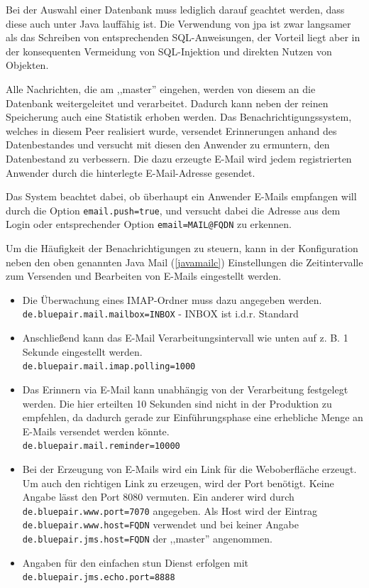 \documentclass[oneside, ngerman, toc=bibliography,bibliography=totoc,listof=entryprefix, open=right,numbers=noenddot,fontsize=12pt]{scrbook}
\begin{document}
Bei der Auswahl einer Datenbank muss lediglich darauf geachtet werden, dass diese auch unter Java lauffähig ist. 
Die Verwendung von \acrshort{jpa} ist zwar langsamer als das Schreiben von entsprechenden SQL-Anweisungen, der Vorteil liegt aber in der konsequenten Vermeidung von SQL-Injektion und direkten Nutzen von Objekten.


Alle Nachrichten, die am ,,master'' eingehen, werden von diesem an die Datenbank weitergeleitet und verarbeitet. Dadurch kann neben der reinen Speicherung auch eine Statistik erhoben werden. Das Benachrichtigungssystem, welches in diesem Peer realisiert wurde, versendet Erinnerungen anhand des Datenbestandes und versucht mit diesen den Anwender zu ermuntern, den Datenbestand zu verbessern.
Die dazu erzeugte E-Mail wird jedem registrierten Anwender durch die hinterlegte E-Mail-Adresse gesendet.

Das System beachtet dabei, ob überhaupt ein Anwender E-Mails empfangen will durch die Option \verb|email.push=true|, und versucht dabei die Adresse aus dem Login oder entsprechender Option \verb|email=MAIL@FQDN| zu erkennen.

Um die Häufigkeit der Benachrichtigungen zu steuern, kann in der Konfiguration neben den oben genannten Java Mail (\ref{javamailc}) Einstellungen die Zeitintervalle zum Versenden und Bearbeiten von E-Mails eingestellt werden.

\begin{itemize}
    \item Die Überwachung eines IMAP-Ordner muss dazu angegeben werden.\\
    \verb|de.bluepair.mail.mailbox=INBOX| - INBOX ist i.d.r. Standard
    \item Anschließend kann das E-Mail Verarbeitungsintervall wie unten auf z. B. 1 Sekunde eingestellt werden.\\
    \verb|de.bluepair.mail.imap.polling=1000|
    \item Das Erinnern via E-Mail kann unabhängig von der Verarbeitung festgelegt werden. Die hier erteilten 10 Sekunden sind nicht in der Produktion zu empfehlen, da dadurch gerade zur Einführungsphase eine erhebliche Menge an E-Mails versendet werden könnte.\\
    \verb|de.bluepair.mail.reminder=10000|
    \item Bei der Erzeugung von E-Mails wird ein Link für die Weboberfläche erzeugt. Um auch den richtigen Link zu erzeugen, wird der Port benötigt. Keine Angabe lässt den Port 8080 vermuten. Ein anderer wird durch \\
    \verb|de.bluepair.www.port=7070| angegeben. Als Host wird der Eintrag \\
    \verb|de.bluepair.www.host=FQDN| verwendet und bei keiner Angabe \\
     \verb|de.bluepair.jms.host=FQDN| der ,,master'' angenommen.
    
    \item Angaben für den einfachen \acrshort{stun} Dienst erfolgen mit \\
    \verb|de.bluepair.jms.echo.port=8888|
    
\end{itemize}
 
\end{document}
